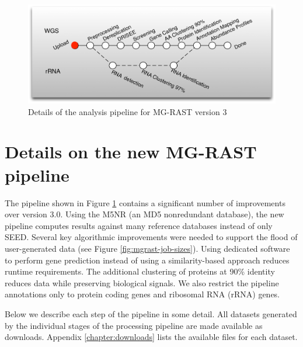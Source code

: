 \documentclass[12pt,fullpage]{report}
\begin{document}

\begin{figure}
\begin{center}
\includegraphics[width=6in]{Images/mgrastv3pipeline.png}
\end{center}
\caption{
Details of the analysis pipeline for MG-RAST version 3}
\label{fig:mgrast-v3-pipeline}
\end{figure}

\section{Details on the new MG-RAST pipeline}

The pipeline shown in Figure \ref{fig:mgrast-v3-pipeline} contains a significant number of improvements over version 3.0.
Using the M5NR \cite{M5NR} (an MD5 nonredundant database), the new pipeline computes results against many reference databases instead of only \gls{SEED}.
Several key algorithmic improvements were needed to support the flood of user-generated data (see Figure \ref{fig:mgrast-job-sizes}). Using dedicated software to perform gene prediction instead of using a similarity-based approach reduces runtime requirements. The additional clustering of proteins at 90\% identity reduces data while preserving biological signals.
We also restrict the pipeline annotations only to protein coding genes and ribosomal RNA (\gls{rRNA}) genes.

Below we describe each step of the pipeline in some detail. All datasets generated by the individual stages of the processing pipeline are made available as downloads. Appendix \ref{chapter:downloads} lists the available files for each dataset.
\end{document}

